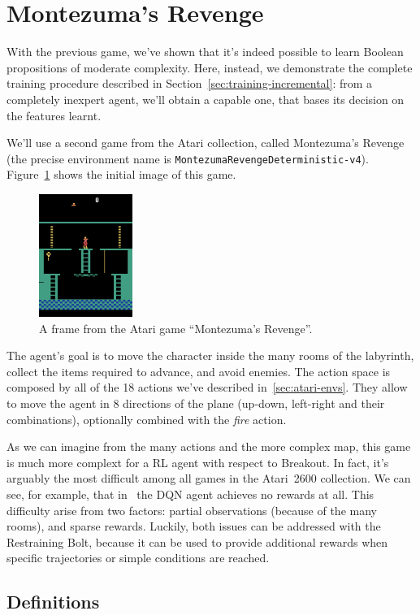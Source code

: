 \section{Montezuma's Revenge}

With the previous game, we've shown that it's indeed possible to learn Boolean
propositions of moderate complexity. Here, instead, we demonstrate the
complete training procedure described in
Section~\ref{sec:training-incremental}: from a completely inexpert agent,
we'll obtain a capable one, that bases its decision on the features learnt.

We'll use a second game from the Atari collection, called Montezuma's Revenge
(the precise environment name is
\verb|MontezumaRevengeDeterministic-v4|). Figure~\ref{fig:mz-frame} shows the
initial image of this game.
\begin{figure}
	\centering
	\includegraphics[height=4cm]{./imgs/mz0.png}
	\caption{A frame from the Atari game ``Montezuma's Revenge''.}
	\label{fig:mz-frame}
\end{figure}
The agent's goal is to move the character inside the many rooms of the
labyrinth, collect the items required to advance, and avoid enemies. The
action space is composed by all of the 18 actions we've described
in~\ref{sec:atari-envs}. They allow to move the agent in 8 directions of the
plane (up-down, left-right and their combinations), optionally combined with
the \textit{fire} action.

As we can imagine from the many actions and the more complex map, this game is
much more complext for a RL agent with respect to Breakout. In fact, it's
arguably the most difficult among all games in the Atari~2600 collection. We
can see, for example, that in~\cite{bib:atari-deepq-nature} the DQN agent
achieves no rewards at all. This difficulty arise from two factors: partial
observations (because of the many rooms), and sparse rewards. Luckily, both
issues can be addressed with the Restraining Bolt, because it can be used to
provide additional rewards when specific trajectories or simple conditions are
reached.


\subsection{Definitions}

